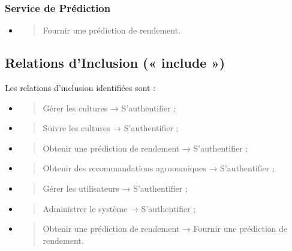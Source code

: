 \documentclass[
]{book}
\begin{document}
\hypertarget{service-de-pruxe9diction-1}{%
\subsubsection{Service de Prédiction}\label{service-de-pruxe9diction-1}}

\begin{itemize}
\item
  \begin{quote}
  Fournir une prédiction de rendement.
  \end{quote}
\end{itemize}

\hypertarget{relations-dinclusion-include}{%
\subsection{Relations d'Inclusion (« include
»)}\label{relations-dinclusion-include}}

Les relations d'inclusion identifiées sont :

\begin{itemize}
\item
  \begin{quote}
  Gérer les cultures → S'authentifier ;
  \end{quote}
\item
  \begin{quote}
  Suivre les cultures → S'authentifier ;
  \end{quote}
\item
  \begin{quote}
  Obtenir une prédiction de rendement → S'authentifier ;
  \end{quote}
\item
  \begin{quote}
  Obtenir des recommandations agronomiques → S'authentifier ;
  \end{quote}
\item
  \begin{quote}
  Gérer les utilisateurs → S'authentifier ;
  \end{quote}
\item
  \begin{quote}
  Administrer le système → S'authentifier ;
  \end{quote}
\item
  \begin{quote}
  Obtenir une prédiction de rendement → Fournir une prédiction de
  rendement.
  \end{quote}
\end{itemize}
\end{document}
